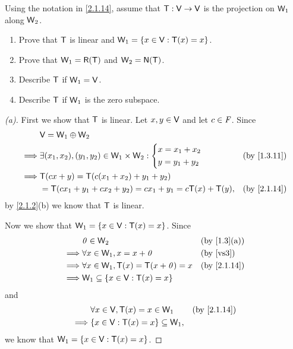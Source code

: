 \setcounter{ex}{25}
\begin{ex}\label{ex:2.1.26}
  Using the notation in \cref{2.1.14}, assume that \(\mathsf{T} : \mathsf{V} \to \mathsf{V}\) is the projection on \(\mathsf{W}_1\) along \(\mathsf{W}_2\).
  \begin{enumerate}
    \item Prove that \(\mathsf{T}\) is linear and \(\mathsf{W}_1 = \left\lbrace x \in \mathsf{V} : \mathsf{T}(x) = x\right\rbrace\).
    \item Prove that \(\W_1 = \rg{\T}\) and \(\W_2 = \ns{\T}\).
    \item Describe \(\mathsf{T}\) if \(\mathsf{W}_1 = \mathsf{V}\).
    \item Describe \(\mathsf{T}\) if \(\mathsf{W}_1\) is the zero subspace.
  \end{enumerate}
\end{ex}

\begin{proof}[(a)]
  First we show that \(\mathsf{T}\) is linear.
  Let \(x, y \in \mathsf{V}\) and let \(c \in \mathit{F}\).
  Since
  \begin{align*}
             & \V = \W_1 \oplus \W_2                                                                               \\
    \implies & \exists (x_1, x_2), (y_1, y_2) \in \W_1 \times \W_2 : \begin{dcases}
                                                                       x = x_1 + x_2 \\
                                                                       y = y_1 + y_2
                                                                     \end{dcases} &  & \text{(by \cref{1.3.11})}   \\
    \implies & \T(cx + y) = \T(c (x_1 + x_2) + y_1 + y_2)                                                          \\
             & = \T(c x_1 + y_1 + c x_2 + y_2) = c x_1 + y_1 = c \T(x) + \T(y),     &  & \text{(by \cref{2.1.14})}
  \end{align*}
  by \cref{2.1.2}(b) we know that \(\mathsf{T}\) is linear.

  Now we show that \(\mathsf{W}_1 = \left\lbrace x \in \mathsf{V} : \mathsf{T}(x) = x\right\rbrace\).
  Since
  \begin{align*}
             & \zv \in \W_2                                &  & \text{(by \cref{1.3}(a))} \\
    \implies & \forall x \in \W_1, x = x + \zv             &  & \text{(by \ref{vs3})}     \\
    \implies & \forall x \in \W_1, \T(x) = \T(x + \zv) = x &  & \text{(by \cref{2.1.14})} \\
    \implies & \W_1 \subseteq \set{x \in \V : \T(x) = x}
  \end{align*}
  and
  \begin{align*}
             & \forall x \in \V, \T(x) = x \in \W_1       &  & \text{(by \cref{2.1.14})} \\
    \implies & \set{x \in \V : \T(x) = x} \subseteq \W_1,
  \end{align*}
  we know that \(\mathsf{W}_1 = \left\lbrace x \in \mathsf{V} : \mathsf{T}(x) = x\right\rbrace\).
\end{proof}

